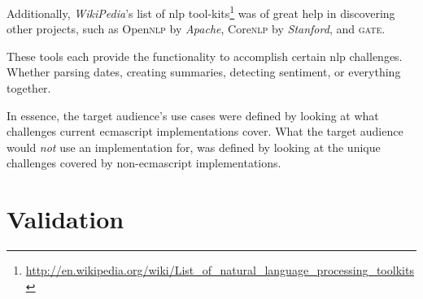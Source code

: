 Additionally, \emph{WikiPedia}'s list of \gls{nlp} tool-kits\footnote{
    \url{http://en.wikipedia.org/wiki/List_of_natural_language_processing_toolkits}
  } was of great help in discovering other projects, such as Open\textsc{nlp}
  by \emph{Apache}, Core\textsc{nlp} by \emph{Stanford}, and \textsc{gate}.

These tools each provide the functionality to accomplish certain \gls{nlp}
  challenges.
Whether parsing dates, creating summaries, detecting sentiment, or everything
  together.

In essence, the target audience's use cases were defined by looking at what
  challenges current \gls{ecmascript} implementations cover.
What the target audience would \emph{not} use an implementation for, was
  defined by looking at the unique challenges covered by non-\gls{ecmascript}
  implementations.

\section*{Validation}\label{addendum-validation}

\endgroup
